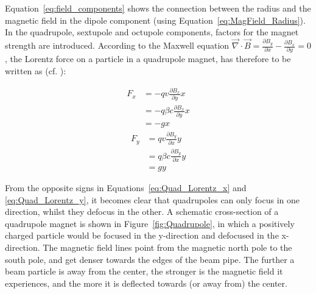 Equation~\ref{eq:field_components} shows the connection between the radius and the magnetic field in the dipole component (using Equation~\ref{eq:MagField_Radius}).
In the quadrupole, sextupole and octupole components, factors for the magnet strength are introduced.
According to the Maxwell equation $\vec{\nabla}\cdot\vec{B} = \frac{\partial B_y}{\partial x} -\frac{\partial B_x}{\partial y} = 0$, the Lorentz force on a particle in a quadrupole magnet, has therefore to be written as (cf. \cite[p. 372]{VacuumElectronics}):
\begin{multicols}{2}
\noindent 
\begin{align}
 F_x &= -qv\frac{\partial B_x}{\partial y}x \nonumber\\
  &= -q\beta c\frac{\partial B_x}{\partial y}x\\
  &= -gx\label{eq:Quad_Lorentz_x}
\end{align}
\columnbreak
\begin{align}
 F_y &= qv\frac{\partial B_y}{\partial x}y\nonumber \\
  &= q\beta c\frac{\partial B_y}{\partial x}y\\
  &= gy \label{eq:Quad_Lorentz_y}
\end{align}
\end{multicols}
From the opposite signs in Equations~\ref{eq:Quad_Lorentz_x} and \ref{eq:Quad_Lorentz_y}, it becomes clear that quadrupoles can only focus in one direction, whilst they defocus in the other.
A schematic cross-section of a quadrupole magnet is shown in Figure~\ref{fig:Quadrupole}, in which a positively charged particle would be focused in the y-direction and defocused in the x-direction.
The magnetic field lines point from the magnetic north pole to the south pole, and get denser towards the edges of the beam pipe.
The further a beam particle is away from the center, the stronger is the magnetic field it experiences, and the more it is deflected towards (or away from) the center.
